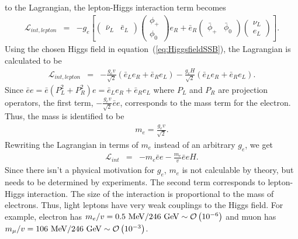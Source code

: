 to the Lagrangian, the lepton-Higgs interaction term becomes 
\begin{eqnarray} 
\mathcal{L}_{int, lepton} 
&=& 
-g_e \left[ 
\left(  \begin{array}{cc} \bar{\nu}_L & \bar{e}_L \end{array} \right)
\left(  \begin{array}{c} \phi_+  \\ \phi_0 \end{array} \right) e_R
+ 
\bar{e}_R
\left(  \begin{array}{cc} \bar{\phi}_+  & \bar{\phi}_0 \end{array} \right) 
\left(  \begin{array}{c} \nu_L \\ e_L \end{array} \right)
\right].
\end{eqnarray} 
Using the chosen Higgs field in equation~(\ref{eq:HiggsfieldSSB}), 
the Lagrangian is calculated to be 
\begin{eqnarray} 
\mathcal{L}_{int, lepton} 
&=& 
-\frac{g_e v}{\sqrt{2}}\left( \bar{e}_L e_R + \bar{e}_R e_L \right)  
-\frac{g_e H}{\sqrt{2}}\left( \bar{e}_L e_R + \bar{e}_R e_L \right). 
\end{eqnarray}
Since $\bar{e}e = \bar{e}(P_L^2+P_R^2)e = \bar{e}_L e_R + \bar{e}_R e_L$ where
$P_L$ and $P_R$ are projection operators, the first term, 
$\displaystyle -\frac{g_e v}{\sqrt{2}} \bar{e}e$, corresponds to the mass term for the electron. 
Thus, the mass is identified to be 
\begin{eqnarray} 
m_e = \frac{g_e v}{\sqrt{2}}.
\end{eqnarray} 
Rewriting the Lagrangian in terms of $m_e$ instead of an arbitrary $g_e$, we get 
\begin{eqnarray} 
\mathcal{L}_{int} 
&=& 
- m_e \bar{e}e  -\frac{m_e}{v} \bar{e}e H. 
\end{eqnarray} 
Since there isn't a physical motivation for $g_e$, $m_e$ is not calculable 
by theory, but needs to be determined by experiments. The second term 
corresponds to lepton-Higgs interaction. The size of the interaction 
is proportional to the mass of electrons. Thus, light leptons have very 
weak couplings to the Higgs field. For example, electron has 
$m_e/v = 0.5~\mathrm{Me\kern -0.1em V}/246~\mathrm{Ge\kern -0.1em V} \sim \mathcal{O}\left(10^{-6}\right)$
and muon has $m_\mu / v = 106~\mathrm{Me\kern -0.1em V}/246~\mathrm{Ge\kern -0.1em V} \sim \mathcal{O}\left(10^{-3}\right)$.

